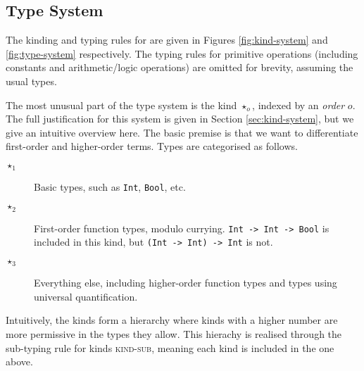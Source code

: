 \documentclass[runningheads]{llncs}
\begin{document}
\subsection{Type System}

The kinding and typing rules for \core{} are given in Figures \ref{fig:kind-system} and \ref{fig:type-system} respectively. The typing rules for primitive operations (including constants and arithmetic/logic operations) are omitted for brevity, assuming the usual types.



The most unusual part of the type system is the kind $\star_o$, indexed by an \textit{order} $o$. The full justification for this system is given in Section \ref{sec:kind-system}, but we give an intuitive overview here. The basic premise is that we want to differentiate first-order and higher-order terms. Types are categorised as follows.

\begin{description}
   \item[$\star_1$] Basic types, such as \texttt{Int}, \texttt{Bool}, etc.
   \item[$\star_2$] First-order function types, modulo currying. \texttt{Int -> Int -> Bool} is included in this kind, but \texttt{(Int -> Int) -> Int} is not.
   \item[$\star_3$] Everything else, including higher-order function types and types using universal quantification.
\end{description}

Intuitively, the kinds form a hierarchy where kinds with a higher number are more permissive in the types they allow. This hierachy is realised through the sub-typing rule for kinds \textsc{kind-sub}, meaning each kind is included in the one above.
\end{document}

